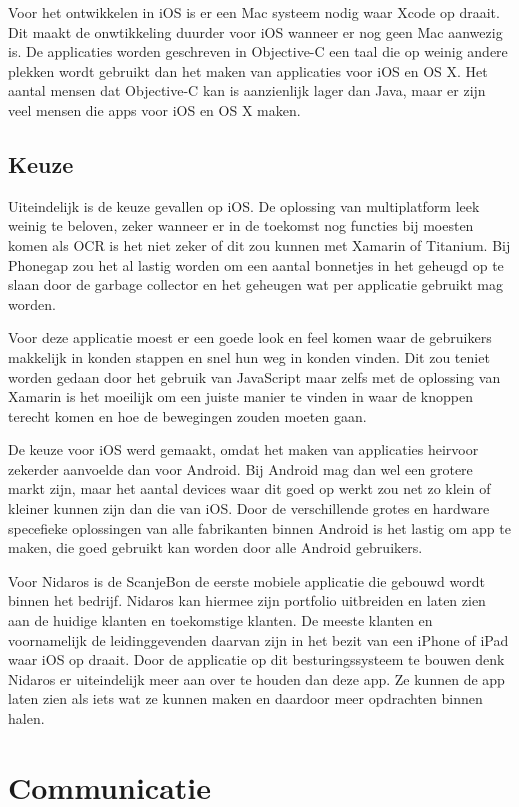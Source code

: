 \documentclass[a4paper,11pt,oneside]{report}
\begin{document}
Voor het ontwikkelen in iOS is er een Mac systeem nodig waar Xcode op draait. Dit maakt de onwtikkeling duurder voor iOS wanneer er nog geen Mac aanwezig is. De applicaties worden geschreven in Objective-C een taal die op weinig andere plekken wordt gebruikt dan het maken van applicaties voor iOS en OS X. Het aantal mensen dat Objective-C kan is aanzienlijk lager dan Java, maar er zijn veel mensen die apps voor iOS en OS X maken.


\subsection{Keuze}
Uiteindelijk is de keuze gevallen op iOS. De oplossing van multiplatform leek weinig te beloven, zeker wanneer er in de toekomst nog functies bij moesten komen als OCR is het niet zeker of dit zou kunnen met Xamarin of Titanium. Bij Phonegap zou het al lastig worden om een aantal bonnetjes in het geheugd op te slaan door de garbage collector en het geheugen wat per applicatie gebruikt mag worden. 

Voor deze applicatie moest er een goede look en feel komen waar de gebruikers makkelijk in konden stappen en snel hun weg in konden vinden. Dit zou teniet worden gedaan door het gebruik van JavaScript maar zelfs met de oplossing van Xamarin is het moeilijk om een juiste manier te vinden in waar de knoppen terecht komen en hoe de bewegingen zouden moeten gaan. 

De keuze voor iOS werd gemaakt, omdat het maken van applicaties heirvoor zekerder aanvoelde dan voor Android. Bij Android mag dan wel een grotere markt zijn, maar het aantal devices waar dit goed op werkt zou net zo klein of kleiner kunnen zijn dan die van iOS. Door de verschillende grotes en hardware specefieke oplossingen van alle fabrikanten binnen Android is het lastig om app te maken, die goed gebruikt kan worden door alle Android gebruikers.

Voor Nidaros is de ScanjeBon de eerste mobiele applicatie die gebouwd wordt binnen het bedrijf. Nidaros kan hiermee zijn portfolio uitbreiden en laten zien aan de huidige klanten en toekomstige klanten. De meeste klanten en voornamelijk de leidinggevenden daarvan zijn in het bezit van een iPhone of iPad waar iOS op draait. Door de applicatie op dit besturingssysteem te bouwen denk Nidaros er uiteindelijk meer aan over te houden dan deze app. Ze kunnen de app laten zien als iets wat ze kunnen maken en daardoor meer opdrachten binnen halen.


\section{Communicatie}
\end{document}
